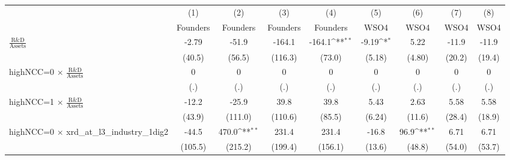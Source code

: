 {
\def\sym#1{\ifmmode^{#1}\else\(^{#1}\)\fi}
\begin{tabular}{l*{8}{c}}
\toprule
                    &\multicolumn{1}{c}{(1)}&\multicolumn{1}{c}{(2)}&\multicolumn{1}{c}{(3)}&\multicolumn{1}{c}{(4)}&\multicolumn{1}{c}{(5)}&\multicolumn{1}{c}{(6)}&\multicolumn{1}{c}{(7)}&\multicolumn{1}{c}{(8)}\\
                    &\multicolumn{1}{c}{Founders}&\multicolumn{1}{c}{Founders}&\multicolumn{1}{c}{Founders}&\multicolumn{1}{c}{Founders}&\multicolumn{1}{c}{WSO4}&\multicolumn{1}{c}{WSO4}&\multicolumn{1}{c}{WSO4}&\multicolumn{1}{c}{WSO4}\\
\midrule
$\frac{\textrm{R\&D}}{\textrm{Assets}}$&       -2.79         &       -51.9         &      -164.1         &      -164.1\sym{**} &       -9.19\sym{*}  &        5.22         &       -11.9         &       -11.9         \\
                    &      (40.5)         &      (56.5)         &     (116.3)         &      (73.0)         &      (5.18)         &      (4.80)         &      (20.2)         &      (19.4)         \\
\addlinespace
highNCC=0 $\times$ $\frac{\textrm{R\&D}}{\textrm{Assets}}$&           0         &           0         &           0         &           0         &           0         &           0         &           0         &           0         \\
                    &         (.)         &         (.)         &         (.)         &         (.)         &         (.)         &         (.)         &         (.)         &         (.)         \\
\addlinespace
highNCC=1 $\times$ $\frac{\textrm{R\&D}}{\textrm{Assets}}$&       -12.2         &       -25.9         &        39.8         &        39.8         &        5.43         &        2.63         &        5.58         &        5.58         \\
                    &      (43.9)         &     (111.0)         &     (110.6)         &      (85.5)         &      (6.24)         &      (11.6)         &      (28.4)         &      (18.9)         \\
\addlinespace
highNCC=0 $\times$ xrd\_at\_l3\_industry\_1dig2&       -44.5         &       470.0\sym{**} &       231.4         &       231.4         &       -16.8         &        96.9\sym{**} &        6.71         &        6.71         \\
                    &     (105.5)         &     (215.2)         &     (199.4)         &     (156.1)         &      (13.6)         &      (48.8)         &      (54.0)         &      (53.7)         \\

\end{tabular}}
